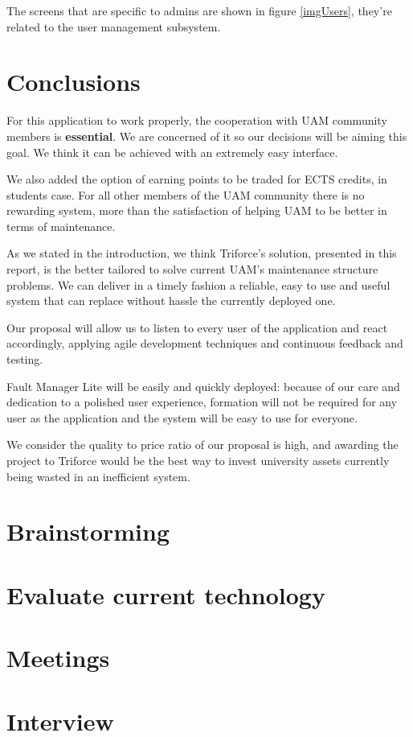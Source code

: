 \documentclass{report}
\begin{document}
The screens that are specific to admins are shown in figure \ref{imgUsers}, they're related to the user management subsystem.

\chapter{Conclusions}

For this application to work properly, the cooperation with UAM community members is \textbf{essential}. We are concerned of it so our decisions will be aiming this goal. We think it can be achieved with an extremely easy interface.

We also added the option of earning points to be traded for ECTS credits, in students case. For all other members of the UAM community there is no rewarding system, more than the satisfaction of helping UAM to be better in terms of maintenance. 
\label{chapConclusions}

As we stated in the introduction, we think Triforce's solution, presented in this report, is the better tailored to solve current UAM's maintenance structure problems. We can deliver in a timely fashion a reliable, easy to use and useful system that can replace without hassle the currently deployed one.

Our proposal will allow us to listen to every user of the application and react accordingly, applying agile development techniques and continuous feedback and testing.

Fault Manager Lite will be easily and quickly deployed: because of our care and dedication to a polished user experience, formation will not be required for any user as the application and the system will be easy to use for everyone.

We consider the quality to price ratio of our proposal is high, and awarding the project to Triforce would be the best way to invest university assets  currently being wasted in an inefficient system.


\appendix

\chapter{Brainstorming}
\label{chapBrainstorming}




\chapter{Evaluate current technology}
\label{chapCurrentTechnology}


\chapter{Meetings}
\label{chapMeetings}



\chapter{Interview}
\label{chapInterview}

\end{document}
